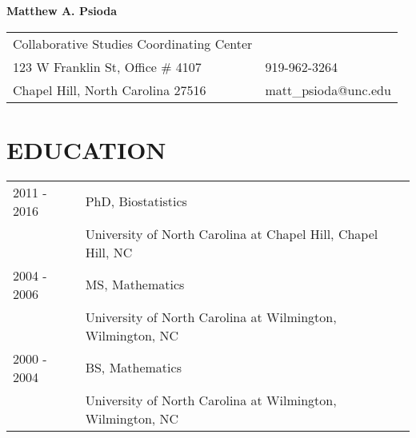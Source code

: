 \documentclass[11pt]{article}
\begin{document}
\begin{center}
{\bf Matthew A. Psioda}\vspace{5pt} \\
\end{center}

\begin{flushleft}
\begin{tabular}[!h]{p{10cm}p{5cm}}
Collaborative Studies Coordinating Center	  &  \\
123 W Franklin St, Office \# 4107 & 919-962-3264 \\
Chapel	Hill,	North Carolina 	27516 &	matt\_psioda@unc.edu \\
\end{tabular}
\end{flushleft}





\section*{\large \bf EDUCATION}
\begin{flushleft}
\begin{tabular}[!h]{p{3cm}p{12.8cm}}
2011 - 2016     & PhD, Biostatistics \\ & University of North Carolina at Chapel Hill, Chapel Hill, NC \vspace{5pt} \\
2004 - 2006			& MS, Mathematics \\ & University of North Carolina at Wilmington, Wilmington, NC \vspace{5pt} \\
2000 - 2004			& BS, Mathematics \\ & University of North Carolina at Wilmington, Wilmington, NC \vspace{5pt} \\
\end{tabular}
\end{flushleft}
\end{document}
